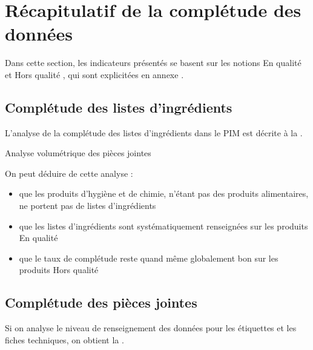         \section{Récapitulatif de la complétude des données}

            Dans cette section, les indicateurs présentés se basent sur les notions \og En qualité \fg et \og Hors qualité \fg, qui sont explicitées en annexe . 

            \subsection{Complétude des listes d'ingrédients}

            L'analyse de la complétude des listes d'ingrédients dans le PIM est décrite à la .

            \begin{table}[htbp]
                \begin{center}
                {\scriptsize
                
                }
                \caption{Analyse volumétrique des pièces jointes}
                \label{tbl:ingredients_counts}
                \end{center}
            \end{table}        

            On peut déduire de cette analyse : 
            \begin{itemize}
                \item que les produits d'hygiène et de chimie, n'étant pas des produits alimentaires, ne portent pas de listes d'ingrédients
                \item que les listes d'ingrédients sont systématiquement renseignées sur les produits \og En qualité \fg
                \item que le taux de complétude reste quand même globalement bon sur les produits \og Hors qualité \fg
            \end{itemize}

            \subsection{Complétude des pièces jointes}

            Si on analyse le niveau de renseignement des données pour les étiquettes et les fiches techniques, on obtient la .

